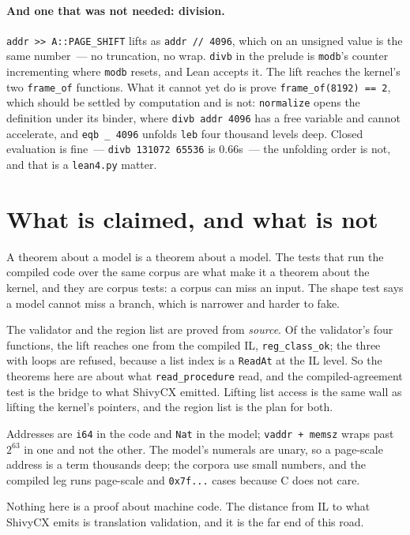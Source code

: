 \documentclass[11pt]{article}
\begin{document}
\paragraph{And one that was not needed: division.}
\texttt{addr >> A::PAGE\_SHIFT} lifts as \texttt{addr // 4096}, which on an
unsigned value is the same number~--- no truncation, no wrap.  \texttt{divb}
in the prelude is \texttt{modb}'s counter incrementing where \texttt{modb}
resets, and Lean accepts it.  The lift reaches the kernel's two
\texttt{frame\_of} functions.  What it cannot yet do is prove
\texttt{frame\_of(8192) == 2}, which should be settled by computation and
is not: \texttt{normalize} opens the definition under its binder, where
\texttt{divb addr 4096} has a free variable and cannot accelerate, and
\texttt{eqb \_ 4096} unfolds \texttt{leb} four thousand levels deep.  Closed
evaluation is fine~--- \texttt{divb 131072 65536} is 0.66s~--- the
unfolding order is not, and that is a \texttt{lean4.py} matter.

\section{What is claimed, and what is not}

A theorem about a model is a theorem about a model.  The tests that run
the compiled code over the same corpus are what make it a theorem about
the kernel, and they are corpus tests: a corpus can miss an input.  The
shape test says a model cannot miss a branch, which is narrower and harder
to fake.

The validator and the region list are proved from \emph{source}.  Of the
validator's four functions, the lift reaches one from the compiled IL,
\texttt{reg\_class\_ok}; the three with loops are refused, because a list
index is a \texttt{ReadAt} at the IL level.  So the theorems here are about
what \texttt{read\_procedure} read, and the compiled-agreement test is the
bridge to what ShivyCX emitted.  Lifting list access is the same wall as
lifting the kernel's pointers, and the region list is the plan for both.

Addresses are \texttt{i64} in the code and \texttt{Nat} in the model;
\texttt{vaddr + memsz} wraps past $2^{63}$ in one and not the other.  The
model's numerals are unary, so a page-scale address is a term thousands
deep; the corpora use small numbers, and the compiled leg runs page-scale
and \texttt{0x7f...} cases because C does not care.

Nothing here is a proof about machine code.  The distance from IL to
what ShivyCX emits is translation validation, and it is the far end of
this road.
\end{document}
